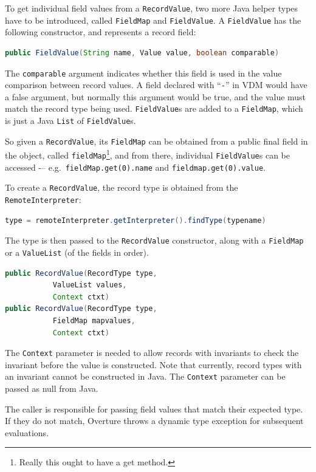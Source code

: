 \documentclass{overturerepchap}
\begin{document}
To get individual field values from a \texttt{RecordValue}, two more Java helper types have to be introduced, called \texttt{FieldMap} and \texttt{FieldValue}. A \texttt{FieldValue} has the following constructor, and represents a record field:

\begin{lstlisting}[language=JAVA]
public FieldValue(String name, Value value, boolean comparable)
\end{lstlisting}

The \texttt{comparable} argument indicates whether this field is used in the value comparison between record values. A field declared with ``\texttt{-}'' in VDM would have a false argument, but normally this argument would be true, and the value must match the record type being used. \texttt{FieldValue}s are added to a \texttt{FieldMap}, which is just a Java \texttt{List} of \texttt{FieldValue}s.

So given a \texttt{RecordValue}, its \texttt{FieldMap} can be obtained from a public final field in the object, called \texttt{fieldMap}\footnote{Really this ought to have a get method.}, and from there, individual \texttt{FieldValue}s can be accessed -– e.g.\ \texttt{fieldMap.get(0).name} and \texttt{fieldmap.get(0).value}.

To create a \texttt{RecordValue}, the record type is obtained from the \texttt{RemoteInterpreter}:

\begin{lstlisting}[language=JAVA]
type = remoteInterpreter.getInterpreter().findType(typename)
\end{lstlisting}

The type is then passed to the \texttt{RecordValue} constructor, along with a \texttt{FieldMap} or a \texttt{ValueList} (of the fields in order).

\begin{lstlisting}[language=JAVA]
public RecordValue(RecordType type,
		   ValueList values, 
		   Context ctxt)
public RecordValue(RecordType type, 
		   FieldMap mapvalues, 
		   Context ctxt)
\end{lstlisting}

The \texttt{Context} parameter is needed to allow records with invariants to check the invariant before the value is constructed. Note that currently, record types with an invariant cannot be constructed in Java. The \texttt{Context} parameter can be passed as null from Java.

The caller is responsible for passing field values that match their expected type. If they do not match, Overture throws a dynamic type exception for subsequent evaluations.
\end{document}
